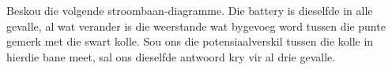 

Beskou die volgende stroombaan-diagramme. Die battery is dieselfde in alle
gevalle, al wat verander is die weerstande wat bygevoeg word tussen die punte
gemerk met die swart kolle. Sou ons die potensiaalverskil tussen die kolle
in hierdie bane meet, sal ons dieselfde antwoord kry vir al drie gevalle.


